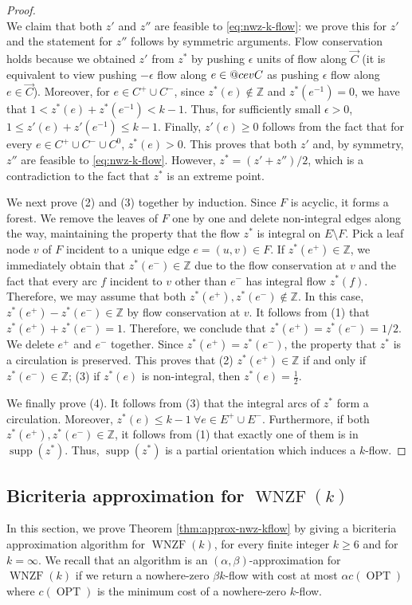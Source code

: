 \documentclass[11pt]{article}
\makeatletter
\newcommand{\Z}{\mathbb{Z}}
\DeclareRobustCommand{\cev}[1]{{\mathpalette\do@cev{#1}}}
\newcommand{\do@cev}[2]{\vbox{\offinterlineskip
    \sbox\z@{$\m@th#1 x$}\ialign{##\cr
      \hidewidth\reflectbox{$\m@th#1\vec{}\mkern4mu$}\hidewidth\cr
      \noalign{\kern-\ht\z@}
      $\m@th#1#2$\cr
    }}}
\DeclareMathOperator{\supp}{supp}
\DeclareMathOperator{\opt}{OPT}
\makeatother
\begin{document}
\begin{proof}
\[        \]
We claim that both $z'$ and $z''$ are feasible to \eqref{eq:nwz-k-flow}: we prove this for $z'$ and the statement for $z''$ follows by symmetric arguments. Flow conservation holds because we obtained $z'$ from $z^*$ by pushing $\epsilon$ units of flow along $\vec{C}$ (it is equivalent to view pushing $-\epsilon$ flow along $e\in \cev{C}$ as pushing $\epsilon$ flow along $e\in \vec{C}$). Moreover, for $e\in C^+\cup C^-$, since $z^*(e)\notin \Z$ and $z^*(e^{-1})=0$, we have that $1<z^*(e)+z^*(e^{-1})<k-1$. Thus, for sufficiently small $\epsilon>0$, $1\leq z'(e)+z'(e^{-1})\leq k-1$. Finally, $z'(e)\geq 0$ follows from the fact that for every $e\in C^+\cup C^-\cup C^0$, $z^*(e)>0$. This proves that both $z'$ and, by symmetry, $z''$ are feasible to \eqref{eq:nwz-k-flow}. However, $z^*=(z'+z'')/2$, which is a contradiction to the fact that $z^*$ is an extreme point. 

We next prove (2) and (3) together by induction. Since $F$ is acyclic, it forms a forest. We remove the leaves of $F$ one by one and delete non-integral edges along the way, maintaining the property that the flow $z^*$ is integral on $E\setminus F$. Pick a leaf node $v$ of $F$ incident to a unique edge $e=(u,v)\in F$. If $z^*(e^+)\in \Z$, we immediately obtain that $z^*(e^-)\in \Z$ due to the flow conservation at $v$ and the fact that every arc $f$ incident to $v$ other than $e^-$ has integral flow $z^*(f)$. Therefore, we may assume that both $z^*(e^+), z^*(e^-)\notin \Z$. In this case, $z^*(e^+)-z^*(e^-)\in \Z$ by flow conservation at $v$. It follows from (1) that $z^*(e^+)+z^*(e^-)=1$. Therefore, we conclude that $z^*(e^+)=z^*(e^-)=1/2$. We delete $e^+$ and $e^-$ together. Since $z^*(e^+)=z^*(e^-)$, the property that $z^*$ is a circulation is preserved. This proves that (2) $z^*(e^+)\in \Z$ if and only if $z^*(e^-)\in \Z$; (3) if $z^*(e)$ is non-integral, then $z^*(e)=\frac{1}{2}$. 

We finally prove (4). It follows from (3) that the integral arcs of $z^*$ form a circulation. Moreover, $z^*(e)\leq k-1\ \forall e\in E^+\cup E^-$. Furthermore, if both $z^*(e^+),z^*(e^-)\in \Z$, it follows from (1) that exactly one of them is in $\supp(z^*)$. Thus, $\supp(z^*)$ is a partial orientation which induces a $k$-flow.
\end{proof}


\subsection{Bicriteria approximation for $\operatorname{WNZF}(k)$}\label{sec:WNZF-approx}
In this section, we prove Theorem \ref{thm:approx-nwz-kflow} by giving a bicriteria approximation algorithm for $\operatorname{WNZF}(k)$, for every finite integer $k\geq 6$ and for $k=\infty$. We recall that an algorithm is an $(\alpha,\beta)$-approximation for $\operatorname{WNZF}(k)$ if we return a nowhere-zero $\beta k$-flow with cost at most $\alpha c(\opt)$ where $c(\opt)$ is the minimum cost of a nowhere-zero $k$-flow. 
\end{document}
